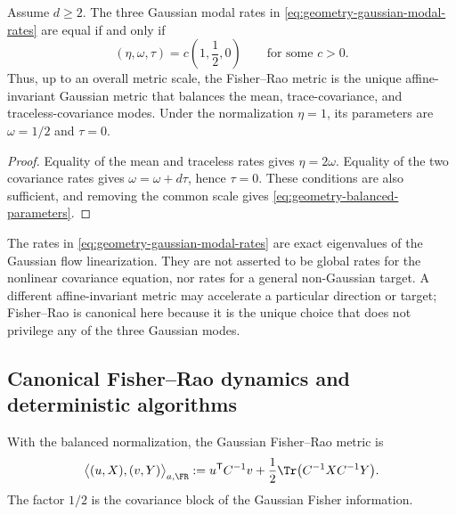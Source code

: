 \begin{theorem}
\label{thm:geometry-balanced}
Assume $d\geq2$.  The three Gaussian modal rates in
\eqref{eq:geometry-gaussian-modal-rates} are equal if and only if
\begin{equation}
\label{eq:geometry-balanced-parameters}
    (\eta,\omega,\tau)=c\left(1,\frac12,0\right)
    \qquad\text{for some }c>0.
\end{equation}
Thus, up to an overall metric scale, the Fisher--Rao metric is the unique
affine-invariant Gaussian metric that balances the mean, trace-covariance,
and traceless-covariance modes.  Under the normalization $\eta=1$, its
parameters are $\omega=1/2$ and $\tau=0$.
\end{theorem}

\begin{proof}
Equality of the mean and traceless rates gives $\eta=2\omega$.
Equality of the two covariance rates gives $\omega=\omega+d\tau$, hence
$\tau=0$.  These conditions are also sufficient, and removing the common
scale gives \eqref{eq:geometry-balanced-parameters}.
\end{proof}

\begin{remark}
\label{rem:geometry-balance-scope}
The rates in \eqref{eq:geometry-gaussian-modal-rates} are exact eigenvalues
of the Gaussian flow linearization.  They are not asserted to be global
rates for the nonlinear covariance equation, nor rates for a general
non-Gaussian target.  A different affine-invariant metric may accelerate a
particular direction or target; Fisher--Rao is canonical here because it is
the unique choice that does not privilege any of the three Gaussian modes.
\end{remark}

\subsection{Canonical Fisher--Rao dynamics and deterministic algorithms}
\label{sec:geometry-fr-algorithms}

With the balanced normalization, the Gaussian Fisher--Rao metric is
\begin{equation}
\label{eq:geometry-fr-metric}
    \bigl\langle(u,X),(v,Y)\bigr\rangle_{a,\FR}
    :=u^{\mathsf T}C^{-1}v
      +\frac12\Tr\bigl(C^{-1}XC^{-1}Y\bigr).
\end{equation}
The factor $1/2$ is the covariance block of the Gaussian Fisher information.

